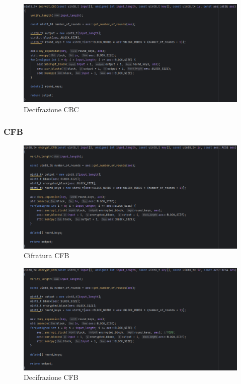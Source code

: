 \textsf{\small } %

\begin{figure}[H]
	\centering
	\includegraphics[width=1\textwidth, height=1\textheight, keepaspectratio]{./images/code/cpp/modes/decrypt_CBC.PNG}
	\caption{Decifrazione CBC}
	\label{fig:decrypt_CBC}
\end{figure}

\subsubsection{CFB}

\textsf{\small } %

\begin{figure}[H]
	\centering
	\includegraphics[width=1\textwidth, height=1\textheight, keepaspectratio]{./images/code/cpp/modes/encrypt_CFB.PNG}
	\caption{Cifratura CFB}
	\label{fig:encrypt_CFB}
\end{figure}

\textsf{\small }

\begin{figure}[H]
	\centering
	\includegraphics[width=1\textwidth, height=1\textheight, keepaspectratio]{./images/code/cpp/modes/decrypt_CFB.PNG}
	\caption{Decifrazione CFB}
	\label{fig:decrypt_CFB}
\end{figure}

